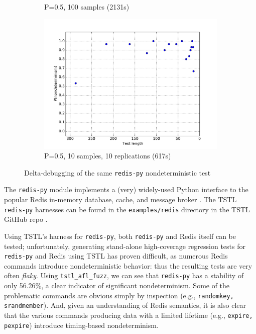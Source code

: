 \begin{figure}
\begin{subfigure}{0.3\columnwidth}
\caption{P=0.5, 100 samples (2131s)}
\label{fig:r2}
\end{subfigure}
\begin{subfigure}{0.3\columnwidth}
\centering
\includegraphics[width=\columnwidth]{redisforceprep}
\caption{P=0.5, 10 samples, 10 replications (617s)}
\label{fig:r3}
\end{subfigure}
\caption{Delta-debugging of the same {\tt redis-py} nondeterministic test}
\end{figure}

The {\tt redis-py} \cite{redispy} module implements a (very) widely-used Python interface
to the popular Redis in-memory database, cache, and
message broker \cite{redis}.  The TSTL {\tt redis-py} harnesses can be found in
the {\tt examples/redis} directory in the TSTL GitHub repo \cite{tstl}.

Using TSTL's harness for {\tt redis-py}, both {\tt redis-py} and Redis
itself can be tested; unfortunately, generating stand-alone
high-coverage regression tests for {\tt redis-py} and Redis using TSTL
has proven difficult, as numerous Redis commands introduce nondeterministic
behavior:  thus the resulting tests are very often \emph{flaky}.   Using {\tt tstl\_afl\_fuzz}, we can see that {\tt redis-py} has a 
stability of only 56.26\%, a clear indicator of significant nondeterminism. Some
of the problematic commands are obvious simply by inspection (e.g.,
{\tt randomkey, srandmember}).  And, given an understanding of Redis
semantics, it is also clear that the various
commands producing data with a limited lifetime (e.g., {\tt expire,
  pexpire}) introduce timing-based nondeterminism.

